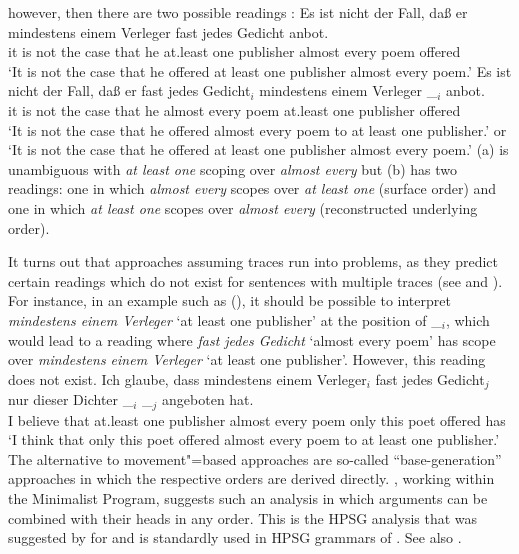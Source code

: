 \documentclass[output=paper
 	        ,biblatex
                ,babelshorthands
                ,newtxmath
                ,draftmode
                ,colorlinks, citecolor=brown
]{langscibook}
\begin{document}
however, then there are two possible readings \citep[]{Frey93a}:
\eal
\ex 
\gll Es ist nicht der Fall, daß er mindestens einem Verleger fast jedes Gedicht anbot.\\
     it is not the case that he at.least one publisher almost every poem offered\\
\glt `It is not the case that he offered at least one publisher almost every poem.'
\ex 
\gll Es ist nicht der Fall, daß er fast jedes Gedicht$_i$ mindestens einem Verleger \_$_i$ anbot.\\
     it is not the case that he almost every poem at.least one publisher {} offered\\
\glt `It is not the case that he offered almost every poem to at least one publisher.' or
     `It is not the case that he offered at least one publisher almost every poem.'
\zl
(a) is unambiguous with \emph{at least one} scoping over \emph{almost every} but (b)
has two readings: one in which \emph{almost every} scopes over \emph{at least one} (surface order)
and one in which \emph{at least one} scopes over \emph{almost every} (reconstructed underlying order).

It turns out that approaches assuming traces run into problems, as they predict certain readings
which do not exist for\label{page-scrambling-scope}
sentences with multiple traces (see \citealp[]{Kiss2001a} and
\citealp[Section~2.6]{Fanselow2001a}). For instance, in an example such as (), it should be
possible to interpret \emph{mindestens einem Verleger} `at least one publisher' at the position of
\_$_i$, which would lead to a reading where \emph{fast jedes Gedicht} `almost every poem' has scope
over \emph{mindestens einem Verleger} `at least one publisher'. However, this reading does not exist.
\ea
\gll Ich glaube, dass mindestens einem Verleger$_i$ fast jedes Gedicht$_j$ nur dieser Dichter \_$_i$ \_$_j$ angeboten hat.\\
     I believe that at.least one publisher almost every poem only this poet {} {} offered has\\
\glt `I think that only this poet offered almost every poem to at least one publisher.'
\z
The alternative to movement"=based approaches are so-called ``base-generation'' approaches in which
the respective orders are derived directly. \citet{Fanselow2001a}, working within the Minimalist
Program, suggests such an analysis in which arguments can be combined with their heads in any
order. This is the HPSG analysis that was suggested by \citet[Section~4.1]{Gunji86a} for  and is
standardly used in HPSG grammars of 
\parencites[]{HN89a}[]{Kiss95b}[]{Meurers99b}[]{Mueller2005c}{MuellerGS}. See also \crossrefchaptert[\page
\pageref{hcs-binary}--\pageref{order:page-scrambling-end}]{order}.
\end{document}
